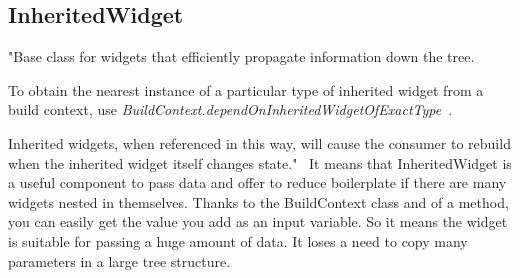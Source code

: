 \subsection{InheritedWidget}\label{subsec:inheritedwidget}
"Base class for widgets that efficiently propagate information down the tree.

To obtain the nearest instance of a particular type of inherited widget from a build context, use \textit{BuildContext.dependOnInheritedWidgetOfExactType}~\cite{dependOnInheritedWidgetOfExactType}.

Inherited widgets, when referenced in this way, will cause the consumer to rebuild when the inherited widget itself changes state."~\cite{inheritedWidget}
It means that InheritedWidget is a useful component to pass data and offer to reduce boilerplate if there are many widgets nested in themselves.
Thanks to the BuildContext class and of a method, you can easily get the value you add as an input variable.
So it means the widget is suitable for passing a huge amount of data.
It loses a need to copy many parameters in a large tree structure.
